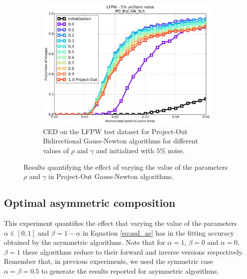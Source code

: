 \begin{figure}[p]
	\begin{subfigure}{0.48\textwidth}
	    \includegraphics[width=\textwidth]{experiments/rho/ced_po_bid_gn_5.png}
	    \caption{CED on the LFPW test dataset for Project-Out Bidirectional Gauss-Newton algorithms for different values of $\rho$ and $\gamma$ and initialized with $5\%$ noise.}
	    \label{fig:ced_po_bid_gn}
	\end{subfigure}
	\caption{Results quantifying the effect of varying the value of the parameters $\rho$ and $\gamma$ in Project-Out Gauss-Newton algorithms.}
	\label{fig:rho}
\end{figure}



\subsection{Optimal asymmetric composition}

This experiment quantifies the effect that varying the value of the parameters $\alpha \in [0, 1]$ and $\beta = 1 -\alpha$ in Equation \ref{eq:ssd_ac} has in the fitting accuracy obtained by the asymmetric algorithms. Note that for $\alpha=1$, $\beta=0$ and $\alpha=0$, $\beta=1$ these algorithms reduce to their forward and inverse versions respectively. Remember that, in previous experiments, we used the symmetric case $\alpha=\beta=0.5$ to generate the results reported for asymmetric algorithms.

